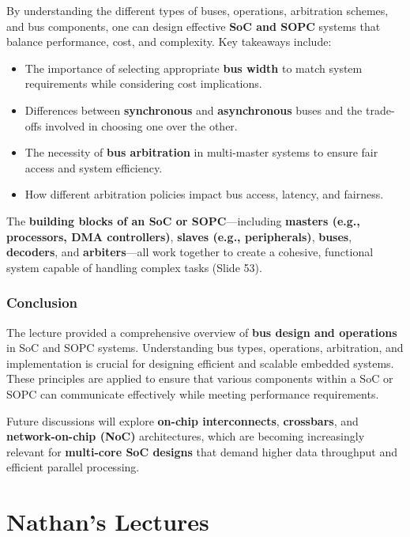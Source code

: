 \documentclass[
  14pt,
  a4paper,
  numbers=noendperiod,
  headinclude=true,
  footinclude=true,
  DIV=calc]{scrreprt}
\begin{document}
By understanding the different types of buses, operations, arbitration
schemes, and bus components, one can design effective \textbf{SoC and
SOPC} systems that balance performance, cost, and complexity. Key
takeaways include:

\begin{itemize}
\item
  The importance of selecting appropriate \textbf{bus width} to match
  system requirements while considering cost implications.
\item
  Differences between \textbf{synchronous} and \textbf{asynchronous}
  buses and the trade-offs involved in choosing one over the other.
\item
  The necessity of \textbf{bus arbitration} in multi-master systems to
  ensure fair access and system efficiency.
\item
  How different arbitration policies impact bus access, latency, and
  fairness.
\end{itemize}

The \textbf{building blocks of an SoC or SOPC}---including
\textbf{masters (e.g., processors, DMA controllers)}, \textbf{slaves
(e.g., peripherals)}, \textbf{buses}, \textbf{decoders}, and
\textbf{arbiters}---all work together to create a cohesive, functional
system capable of handling complex tasks (Slide 53).

\section{Conclusion}\label{conclusion-4}

The lecture provided a comprehensive overview of \textbf{bus design and
operations} in SoC and SOPC systems. Understanding bus types,
operations, arbitration, and implementation is crucial for designing
efficient and scalable embedded systems. These principles are applied to
ensure that various components within a SoC or SOPC can communicate
effectively while meeting performance requirements.

Future discussions will explore \textbf{on-chip interconnects},
\textbf{crossbars}, and \textbf{network-on-chip (NoC)} architectures,
which are becoming increasingly relevant for \textbf{multi-core SoC
designs} that demand higher data throughput and efficient parallel
processing.

\part{Nathan's Lectures}
\end{document}
